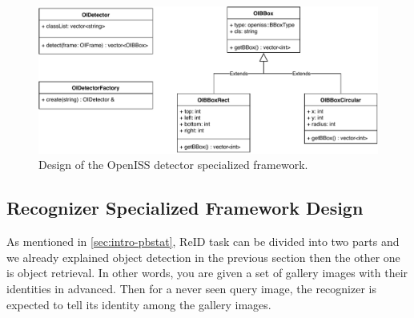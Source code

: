 \begin{figure}
    \centering
    \includegraphics[width=\linewidth]{figures/framework_sub_detector.pdf}
    \caption{Design of the OpenISS detector specialized framework.}
    \label{fig:fw-sub-detector}
\end{figure}

\subsection{Recognizer Specialized Framework Design}
\label{sec:fw-design-spec-recognizer}

As mentioned in \autoref{sec:intro-pbstat}, ReID task can be divided
into two parts and we already explained object detection in the previous
section then the other one is object retrieval.
In other words, you are given a set of gallery images with their identities in
advanced. Then for a never seen query image, the recognizer is expected to tell
its identity among the gallery images.

